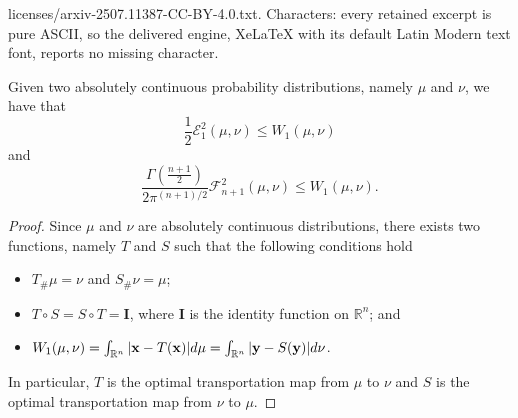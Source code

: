 \documentclass[10pt,a4paper]{amsart}
\def \Id{\mathbf{I}}
\def\bx{{\bf x}}
\def\by{{\bf y}}
\def \erre{\mathbb{R}}
\renewcommand{\le}{\leqslant}
\begin{document}
licenses/arxiv-2507.11387-CC-BY-4.0.txt. Characters: every retained excerpt is pure ASCII, so the delivered engine, XeLaTeX with its default Latin Modern text font, reports no missing character.
\begin{theorem}
    Given two absolutely continuous probability distributions, namely $\mu$ and $\nu$, we have that
    \begin{equation}
        \frac{1}{2}\mathcal{E}^2_1(\mu,\nu)\le W_1(\mu,\nu)
    \end{equation}
    and
    \begin{equation}
        \frac{\Gamma\left(\frac{n+1}2\right)}{2\pi^{(n+1)/2}}\mathcal{F}^2_{n+1}(\mu,\nu)\le W_1(\mu,\nu).
    \end{equation}
\end{theorem}

\begin{proof}
    Since $\mu$ and $\nu$ are absolutely continuous distributions, there exists two functions, namely $T$ and $S$ such that the following conditions hold
    \begin{itemize}
        \item $T_\#\mu=\nu$ and $S_\#\nu=\mu$;
        \item $T\circ S= S \circ T= \Id$, where $\Id$ is the identity function on $\erre^n$; and
        \item $W_1(\mu,\nu)=\int_{\erre^{n}}|\bx-T(\bx)|d\mu=\int_{\erre^{n}}|\by-S(\by)|d\nu$.
    \end{itemize}
    In particular, $T$ is the optimal transportation map from $\mu$ to $\nu$ and $S$ is the optimal transportation map from $\nu$ to $\mu$.


\end{proof}
\end{document}

